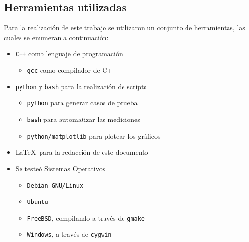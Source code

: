 \documentclass[11pt, a4paper, twoside]{article}
\begin{document}
{}

\subsection{Herramientas utilizadas}\label{subsec:instrucciones-herramientas}

Para la realización de este trabajo se utilizaron un conjunto de herramientas, las cuales se enumeran a continuación:

\begin{itemize}
  \item \texttt{C++} como lenguaje de programación
    \begin{itemize}
      \item \texttt{gcc} como compilador de C++
    \end{itemize}
  \item \texttt{python} y \texttt{bash} para la realización de scripts
    \begin{itemize}
      \item \texttt{python} para generar casos de prueba
      \item \texttt{bash} para automatizar las mediciones
      \item \texttt{python/matplotlib} para plotear los gráficos
    \end{itemize}
  \item \LaTeX\ para la redacción de este documento
  \item Se testeó Sistemas Operativos \hfill
    \begin{itemize}
      \item \texttt{Debian GNU/Linux}
      \item \texttt{Ubuntu}
      \item \texttt{FreeBSD}, compilando a través de \texttt{gmake}
      \item \texttt{Windows}, a través de \texttt{cygwin}
    \end{itemize}
\end{itemize}

\end{document}
